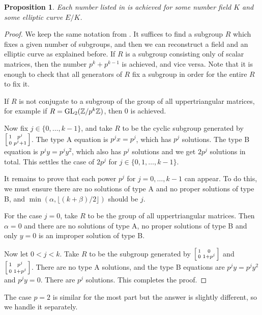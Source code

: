 \documentclass[10pt,leqno]{amsart}
\newcommand\sm[1]{\begin{bsmallmatrix}#1\end{bsmallmatrix}}
\newcommand{\Z}{\mathbb{Z}}
\newcommand{\GL}{\textnormal{GL}}
\newtheorem{proposition}[theorem]{Proposition}
\theoremstyle{definition}
\theoremstyle{remark}
\numberwithin{theorem}{section}
\begin{document}
\begin{proposition}
    Each number listed in  is achieved for some number field $K$ and some elliptic curve $E/K$.
\end{proposition}
\begin{proof} We keep the same notation from . It suffices to find a subgroup $R$ which fixes a given number of subgroups, and then we can reconstruct a field and an elliptic curve as explained before. If $R$ is a subgroup consisting only of scalar matrices, then the number $p^k+p^{k-1}$ is achieved, and vice versa. Note that it is enough to check that all generators of $R$ fix a subgroup in order for the entire $R$ to fix it. 

If $R$ is not conjugate to a subgroup of the group of all uppertriangular matrices, for example if $R=\GL_2(\Z/p^k\Z)$, then $0$ is achieved. 

    Now fix $j\in \{0,\ldots, k-1\}$, and take $R$ to be the cyclic subgroup generated by $\sm{1 & p^j \\
    0 & p^j+1}$. The type A equation is $p^jx=p^j$, which has $p^j$ solutions. The type B equation is $p^jy=p^j y^2$, which also has $p^j$ solutions and we get $2p^j$ solutions in total. This settles the case of $2p^j$ for $j\in \{0, 1, \ldots, k-1\}$. 
    
    It remains to prove that each power $p^j$ for $j=0, \ldots, k-1$ can appear. To do this, we must ensure there are no solutions of type A and no proper solutions of type B, and $\min(\alpha, \lfloor (k+\beta)/2 \rfloor)$ should be $j$.

    For the case $j=0$, take $R$ to be the group of all uppertriangular matrices. Then $\alpha=0$ and there are no solutions of type A, no proper solutions of type B and only $y=0$ is an improper solution of type B.

    Now let $0<j<k$. Take $R$ to be the subgroup generated by $\sm{1 & 0 \\ 0 & 1+p^j}$ and $\sm{1 & p^j \\ 0 & 1+p^j}$. There are no type A solutions, and the type B equations are $p^j y=p^j y^2$ and $p^j y=0$. There are $p^j$ solutions. This completes the proof.
\end{proof}
The case $p=2$ is similar for the most part but the answer is slightly different, so we handle it separately.
\end{document}
